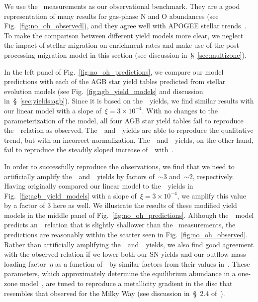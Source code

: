 \documentclass[ms.tex]{subfiles}
\begin{document}
We use the~\citet{Dopita2016} measurements as our observational benchmark.
They are a good representation of many results for gas-phase N and O abundances
(see Fig.~\ref{fig:no_oh_observed}), and they agree well with APOGEE stellar
trends~\citep{Vincenzo2021}.
To make the comparison between different yield models more clear, we neglect
the impact of stellar migration on enrichment rates and make use of the
post-processing migration model in this section (see discussion
in~\S~\ref{sec:multizone}).
\par
In the left panel of Fig.~\ref{fig:no_oh_predictions}, we compare our model
predictions with each of the AGB star yield tables predicted from stellar
evolution models (see Fig.~\ref{fig:agb_yield_models} and discussion
in~\S~\ref{sec:yields:agb}).
Since it is based on the~\cristallo~yields, we find similar results with our
linear model with a slope of~$\xi = 3\times10^{-4}$.
With no changes to the~\citet{Johnson2021} parameterization of the model, all
four AGB star yield tables fail to reproduce the~\ohno~relation as observed.
The~\cristallo~and~\ventura~yields are able to reproduce the qualitative trend,
but with an incorrect normalization.
The~\karakasten~and~\karakas~yields, on the other hand, fail to reproduce
the steadily sloped increase of~\no~with~\oh.
\par
In order to successfully reproduce the observations, we find that we need to
artificially amplify the~\cristallo~and~\ventura~yields by factors of~$\sim$3
and~$\sim$2, respectively.
Having originally compared our linear model to the~\cristallo~yields in
Fig.~\ref{fig:agb_yield_models} with a slope of~$\xi = 3\times10^{-4}$, we
amplify this value by a factor of 3 here as well.
We illustrate the results of these modified yield models in the middle panel
of Fig.~\ref{fig:no_oh_predictions}.
Although the~\ventura~model predicts an~\ohno~relation that is slightly
shallower than the~\citet{Dopita2016} measurements, the predictions are
reasonably within the scatter seen in Fig.~\ref{fig:no_oh_observed}.
Rather than artificially amplifying the~\cristallo~and~\ventura~yields, we also
find good agreement with the observed relation if we lower both our SN yields
and our outflow mass loading factor~$\eta$ as a function of~\rgal~by similar
factors from their values in~\citet{Johnson2021}.
These parameters, which approximately determine the equilibrium abundance in a
one-zone model~\citep{Weinberg2017}, are tuned to reproduce a metallicity
gradient in the disc that resembles that observed for the Milky Way (see
discussion in~\S~2.4 of~\citealp{Johnson2021}).
\end{document}
